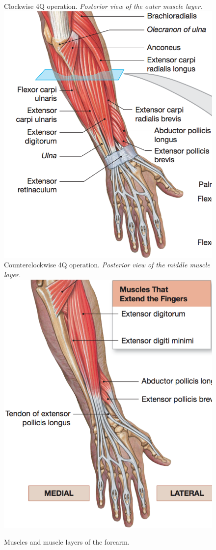 \begin{figure}[H]
	\subcaptionbox  %
	{               %
		Clockwise 4Q operation.\newline                              %
		\emph{Posterior view of the outer muscle layer. \cite{martini}}                %
		\label{fig:postSuperior}                                  %
	}                                                                 %
	{                                                                  %
		\includegraphics[width=.46\textwidth]{figures/Anatomy/posteriorSuperficial}         %
	}                                                                    %
	\hspace{5pt}                                                          %
	\subcaptionbox  %
	{                                                                       %
		Counterclockwise 4Q operation.\newline                                 %
		\emph{Posterior view of the middle muscle layer.\cite{martini}}                          %
		\label{fig:postMiddle}                                     %
	}                                                                           %
	{                                                                            %
		\includegraphics[width=.46\textwidth]{figures/Anatomy/posteriorMiddle}            %
	}                                                                             %
	\caption{Muscles and muscle layers of the forearm.}%
	\label{fig:musclesForarm}
\end{figure}

